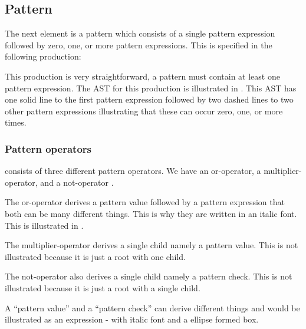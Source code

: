 \subsection{Pattern}%

The next element is a pattern which consists of a single pattern expression followed by zero, one, or more pattern expressions. This is specified in the following production:%

\begin{ebnf}%
%
\end{ebnf}%

This production is very straightforward, a pattern must contain at least one pattern expression. The AST for this production is illustrated in . This AST has one solid line to the first pattern expression followed by two dashed lines to two other pattern expressions illustrating that these can occur zero, one, or more times.%

%

\subsubsection{Pattern operators}%

\productname{} consists of three different pattern operators. We have an or-operator, a multiplier-operator, and a not-operator .

The or-operator derives a pattern value followed by a pattern expression that both can be many different things. This is why they are written in an italic font. This is illustrated in .%

%

The multiplier-operator derives a single child namely a pattern value. This is not illustrated because it is just a root with one child.%


The not-operator also derives a single child namely a pattern check. This is not illustrated because it is just a root with a single child.%

A ``pattern value'' and a ``pattern check'' can derive different things and would be illustrated as an expression - with italic font and a ellipse formed box.


